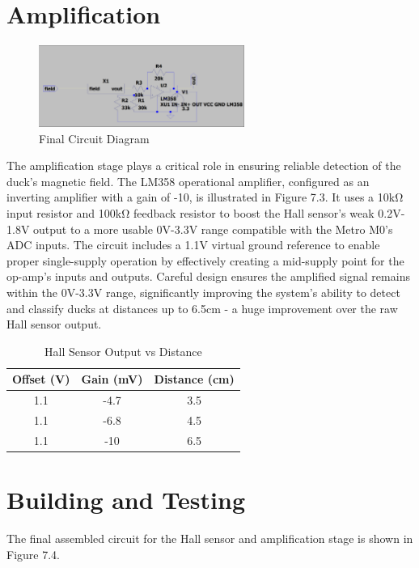 \section{Amplification}
\begin{figure}[H]
    \centering
    \includegraphics[width=0.6\textwidth]{subpages/images/magnet_circuit.png}
    \caption{Final Circuit Diagram}
    \label{fig:circuit}
\end{figure}
The amplification stage plays a critical role in ensuring reliable detection of the duck's magnetic field. The LM358 operational amplifier, configured as an inverting amplifier with a gain of -10, is illustrated in Figure 7.3. It uses a 10kΩ input resistor and 100kΩ feedback resistor to boost the Hall sensor's weak 0.2V-1.8V output to a more usable 0V-3.3V range compatible with the Metro M0's ADC inputs. The circuit includes a 1.1V virtual ground reference to enable proper single-supply operation by effectively creating a mid-supply point for the op-amp's inputs and outputs. Careful design ensures the amplified signal remains within the 0V-3.3V range, significantly improving the system's ability to detect and classify ducks at distances up to 6.5cm - a huge improvement over the raw Hall sensor output.
\begin{table}[H]
    \centering
    \begin{tabular}{|c|c|c|}
        \hline
        \textbf{Offset (V)} & \textbf{Gain (mV)} & \textbf{Distance (cm)} \\
        \hline
        1.1                 & -4.7               & 3.5                    \\
        \hline
        1.1                 & -6.8               & 4.5                    \\
        \hline
        1.1                 & -10                & 6.5                    \\
        \hline
    \end{tabular}
    \caption{Hall Sensor Output vs Distance}
    \label{tab:hall_output_distance}
\end{table}

\section{Building and Testing}
The final assembled circuit for the Hall sensor and amplification stage is shown in Figure 7.4.

